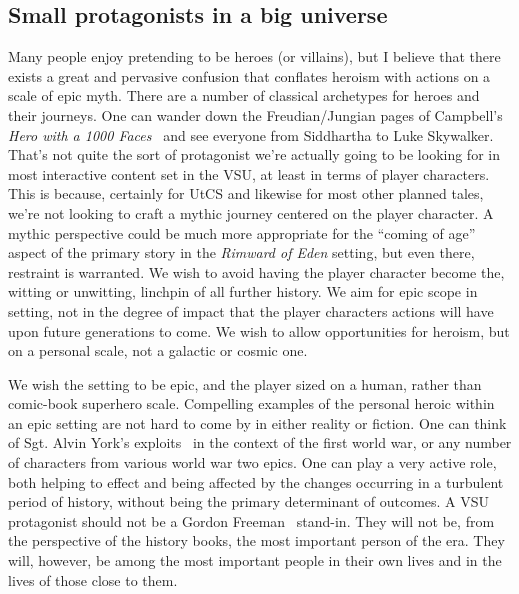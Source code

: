 \subsection{Small protagonists in a big universe}
\label{smallProtagonists}
Many people enjoy pretending to be heroes (or villains), but I believe
that there exists a great and pervasive confusion that conflates
heroism with actions on a scale of epic myth. There are a number of
classical archetypes for heroes and their journeys. One can wander
down the Freudian/Jungian pages of Campbell's {\em Hero with a 1000
Faces}~\cite{herowith1000faces} and see everyone from Siddhartha to
Luke Skywalker.  That's not quite the sort of protagonist we're
actually going to be looking for in most interactive content set in
the VSU, at least in terms of player characters. This is because,
certainly for UtCS and likewise for most other planned tales, we're
not looking to craft a mythic journey centered on the player
character. A mythic perspective could be much more appropriate for the ``coming of age'' aspect of the primary story in the {\it
Rimward of Eden} setting, but even there, restraint is warranted. We
wish to avoid having the player character become the, witting or
unwitting, linchpin of all further history. We aim for epic scope in
setting, not in the degree of impact that the player characters
actions will have upon future generations to come. We wish to allow
opportunities for heroism, but on a personal scale, not a galactic or
cosmic one.

We wish the setting to be epic, and the player sized on a human,
rather than comic-book superhero scale. Compelling examples of the
personal heroic within an epic setting are not hard to come by in
either reality or fiction. One can think of Sgt. Alvin York's
exploits~\cite{SergeantYork} in the context of the first world war, or
any number of characters from various world war two epics. One can
play a very active role, both helping to effect and being affected by
the changes occurring in a turbulent period of history, without being
the primary determinant of outcomes. A VSU protagonist should not be a
Gordon Freeman~\cite{Half-Life-GordonFreeman} stand-in. They will not
be, from the perspective of the history books, the most important
person of the era. They will, however, be among the most important
people in their own lives and in the lives of those close to them.


